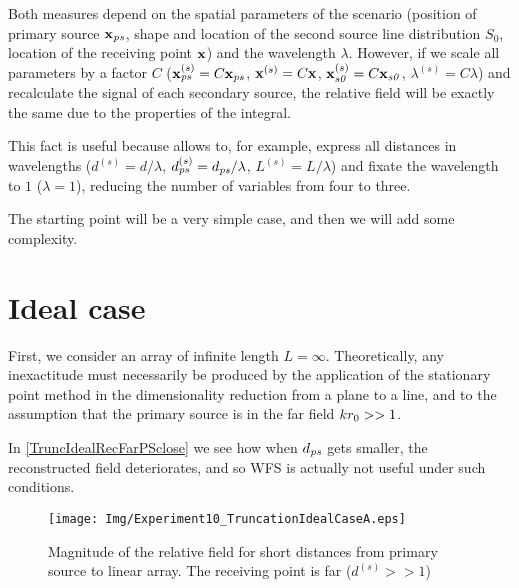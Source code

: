 Both measures depend on the spatial parameters of the scenario (position of primary source $\PosTheo[primarySource]$, shape and location of the second source line distribution $S_0$, location of the receiving point $\PosTheo$) and the wavelength $\lambda$. However, if we scale all parameters by a factor $C$ ($\PosTheo[primarySource]^{(s)} = C \PosTheo[primarySource]$, $\PosTheo^{(s)} = C\PosTheo$, $\PosTheo[section]^{(s)} = C\PosTheo[section]$, $\lambda^{(s)} = C\lambda$) and recalculate the signal of each secondary source, the relative field will be exactly the same due to the properties of the integral.

This fact is useful because allows to, for example, express all distances in wavelengths ($d^{(s)} = d/\lambda$, $d_{\PosTheoSubInd[primarySource]}^{(s)} = d_{\PosTheoSubInd[primarySource]}/\lambda$, $L^{(s)} = L/\lambda$) and fixate the wavelength to $1$ ($\lambda = 1$), reducing the number of variables from four to three. 

The starting point will be a very simple case, and then we will add some complexity.

\section{Ideal case}
First, we consider an array of infinite length $L=\infty$.
Theoretically, any inexactitude must necessarily be produced by the application of the stationary point method in the dimensionality reduction from a plane to a line, and to the assumption that the primary source is in the far field $kr_0 >> 1$.

In \autoref{TruncIdealRecFarPSclose} we see how when $d_{\PosTheoSubInd[primarySource]}$ gets smaller, the reconstructed field deteriorates, and so WFS is actually not useful under such conditions.
\begin{figure}[h]
	\centering
	\texttt{[image: Img/Experiment10\_TruncationIdealCaseA.eps]}
	\caption{Magnitude of the relative field for short distances from primary source to linear array. The receiving point is far ($d^{(s)} >> 1$)}
	\label{TruncIdealRecFarPSclose}
\end{figure}

